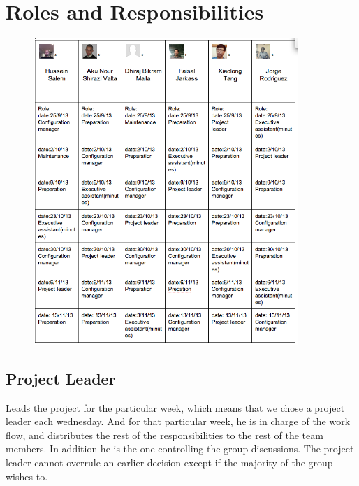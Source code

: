\renewcommand{\headrulewidth}{0.1pt}
\renewcommand{\footrulewidth}{0.1pt}

\section*{Roles and Responsibilities}


\begin{figure}[ht!]
\centering
\includegraphics[width=100mm]{graphics/roles.png}
\label{roles}
\end{figure}



\subsection*{Project Leader}
Leads the project for the particular week, which means that we chose a project leader each wednesday. And for that particular week, he is in charge of the work flow, and distributes the rest of the responsibilities to the rest of the team members. In addition he is the one controlling the group discussions. The project leader cannot overrule an earlier decision except if the majority of the group wishes to.



